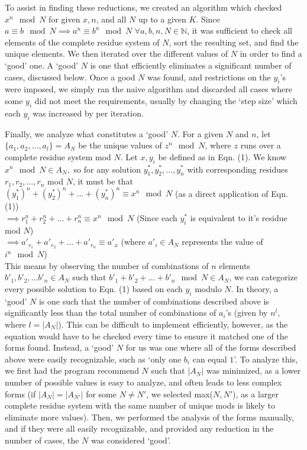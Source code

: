 \documentclass{article}
\begin{document}
\begin{flushleft}
To assist in finding these reductions, we created an algorithm which checked $x^n \mod N$ for given $x, n$, and all $N$ up to a given $K$. Since $a \equiv b \mod N \implies a^n \equiv b^n \mod N$ $\forall a, b, n, N \in \mathbb{N}$, it was sufficient to check all elements of the complete residue system of $N$, sort the resulting set, and find the unique elements. We then iterated over the different values of $N$ in order to find a `good' one. A `good' $N$ is one that efficiently eliminates a significant number of cases, discussed below. Once a good $N$ was found, and restrictions on the $y_i$'s were imposed, we simply ran the naive algorithm and discarded all cases where some $y_i$ did not meet the requirements, usually by changing the `step size' which each $y_i$ was increased by per iteration.

Finally, we analyze what constitutes a `good' $N$. For a given $N$ and $n$, let $\{a_1, a_2, \ldots, a_l\} = A_N$ be the unique values of $z^n \mod N$, where $z$ runs over a complete residue system mod $N$. Let $x, y_i$ be defined as in Eqn. (1). We know $x^n \mod N \in A_N,$ so for any solution $y^*_1, y^*_2, \ldots, y^*_n$ with corresponding residues $r_1, r_2, \ldots, r_n$ mod $N$, it must be that $(y^*_1)^n + (y^*_2)^n + \ldots + (y^*_n)^n \equiv x^n \mod N$ (as a direct application of Eqn. (1)) \\
$\implies r_1^n + r_2^n + \ldots + r_n^n \equiv x^n \mod N$ (Since each $y^*_i$ is equivalent to it's residue mod $N$) \\
$\implies a'_{r_1} + a'_{r_2} + \ldots + a'_{r_n} \equiv a'_{x}$ (where $a'_{i} \in A_N$ represents the value of $i^n \mod N$) \\
This means by observing the number of combinations of $n$ elements $b'_1, b'_2, \ldots b'_n \in A_N$ such that $b'_1 + b'_2 + \ldots + b'_n \mod N \in A_N$, we can categorize every possible solution to Eqn. (1) based on each $y_i$ modulo $N$. In theory, a `good' $N$ is one such that the number of combinations described above is significantly less than the total number of combinations of $a_i$'s (given by $n^l$, where $l = |A_N|$). This can be difficult to implement efficiently, however, as the equation would have to be checked every time to ensure it matched one of the forms found. Instead, a `good' $N$ for us was one where all of the forms described above were easily recognizable, such as `only one $b_i$ can equal $1$'. To analyze this, we first had the program recommend $N$ such that $|A_N|$ was minimized, as a lower number of possible values is easy to analyze, and often leads to less complex forms (if $|A_N| = |A_{N'}|$ for some $N \neq N'$, we selected max($N, N'$), as a larger complete residue system with the same number of unique mods is likely to eliminate more values). Then, we performed the analysis of the forms manually, and if they were all easily recognizable, and provided any reduction in the number of cases, the $N$ was considered `good'.


\end{flushleft}
\end{document}
